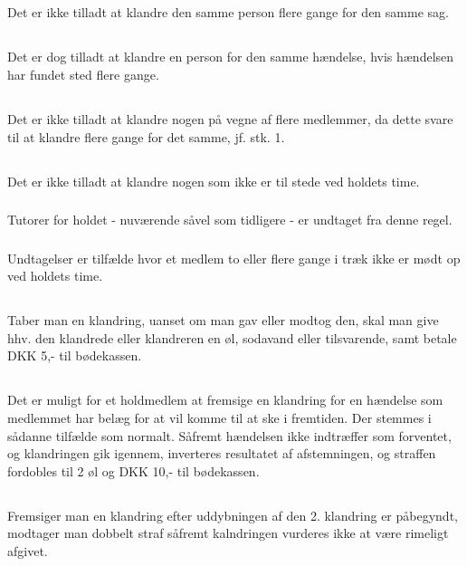 \documentclass{article}
\begin{document}
	\subsection{}
	Det er ikke tilladt at klandre den samme person flere gange for den samme sag.
	\subsection{}
	Det er dog tilladt at klandre en person for den samme hændelse, hvis hændelsen har fundet sted flere gange.
	\subsection{}
	Det er ikke tilladt at klandre nogen på vegne af flere medlemmer, da dette svare til at klandre flere gange for det samme, jf. stk. 1.
	\subsection{}
	Det er ikke tilladt at klandre nogen som ikke er til stede ved holdets time.
	\subsubsection{}
	Tutorer for holdet - nuværende såvel som tidligere - er undtaget fra denne regel.
	\subsubsection{}
	Undtagelser er tilfælde hvor et medlem to eller flere gange i træk ikke er mødt op ved holdets time.
	\subsection{}
	Taber man en klandring, uanset om man gav eller modtog den, skal man give hhv. den klandrede eller klandreren en øl, sodavand eller tilsvarende, samt betale DKK 5,- til bødekassen.
	\subsection{}
	Det er muligt for et holdmedlem at fremsige en klandring for en hændelse som medlemmet har belæg for at vil komme til at ske i fremtiden. Der stemmes i sådanne tilfælde som normalt. Såfremt hændelsen ikke indtræffer som forventet, og klandringen gik igennem, inverteres resultatet af afstemningen, og straffen fordobles til 2 øl og DKK 10,- til bødekassen.
	\subsection{}
	Fremsiger man en klandring efter uddybningen af den 2. klandring er påbegyndt, modtager man dobbelt straf såfremt kalndringen vurderes ikke at være rimeligt afgivet.
\end{document}
